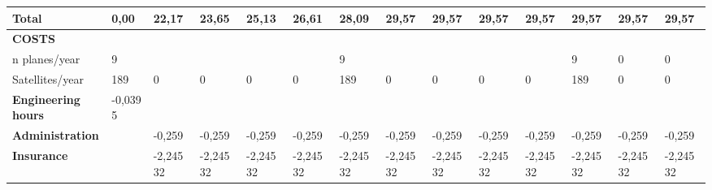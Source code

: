 \begin{landscape}
\begin{table}[]
{\begin{tabular}{| l | l | l | l | l | l | l | l | l | l | l | l | l | l |}
\textbf{Total}                                                                         & \textbf{0,00}    & \textbf{22,17}  & \textbf{23,65}  & \textbf{25,13}  & \textbf{26,61}  & \textbf{28,09}  & \textbf{29,57}  & \textbf{29,57}  & \textbf{29,57}  & \textbf{29,57}  & \textbf{29,57}   & \textbf{29,57}   & \textbf{29,57}   
\\ \hline
\rowcolor[gray]{0.85}
\textbf{COSTS}                                                                         &                  &                 &                 &                 &                 &                 &                 &                 &                 &                 &                  &                  &                  \\
n planes/year                                                                          & 9                &                 &                 &                 &                 & 9               &                 &                 &                 &                 & 9                & 0                & 0                \\
Satellites/year                                                                        & 189              & 0               & 0               & 0               & 0               & 189             & 0               & 0               & 0               & 0               & 189              & 0                & 0                \\
\textbf{Engineering hours}                                                             & -0,0395          &                 &                 &                 &                 &                 &                 &                 &                 &                 &                  &                  &                  \\
\textbf{Administration}                                                                &                  & -0,259          & -0,259          & -0,259          & -0,259          & -0,259          & -0,259          & -0,259          & -0,259          & -0,259          & -0,259           & -0,259           & -0,259           \\
\textbf{Insurance}                                                                     &                  & -2,24532        & -2,24532        & -2,24532        & -2,24532        & -2,24532        & -2,24532        & -2,24532        & -2,24532        & -2,24532        & -2,24532         & -2,24532         & -2,24532         \\

\end{tabular}}
\end{table}
\end{landscape}
